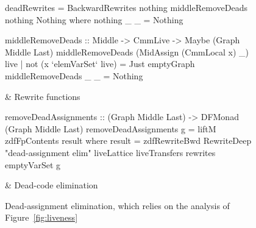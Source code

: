 \documentclass[blockstyle,preprint,nocopyrightspace]{sigplanconf}
\newcommand{\authornote}[1]{{\em #1}}
\def\authornote#1{\unskip\relax}
\newcommand{\john}[1]{\authornote{JD: #1}}
\newcommand\figref[1]{Figure~\ref{fig:#1}}
\newcommand\figlabel[1]{\label{fig:#1}}
\begin{document}



\begin{figure*}
\begin{codetable}
\T\begin{code}
deadRewrites = BackwardRewrites nothing middleRemoveDeads nothing Nothing
  where nothing _ _ = Nothing

middleRemoveDeads :: Middle -> CmmLive -> Maybe (Graph Middle Last)
middleRemoveDeads (MidAssign (CmmLocal x) _) live
    | not (x `elemVarSet` live) = Just emptyGraph
middleRemoveDeads _ _ = Nothing
\end{code}%
\B
& Rewrite \mbox{functions}\\
\hline

\T\begin{code}
removeDeadAssignments :: (Graph Middle Last) -> DFMonad (Graph Middle Last)
removeDeadAssignments g = liftM zdfFpContents result
     where result = zdfRewriteBwd RewriteDeep "dead-assignment elim"
                                  liveLattice liveTransfers rewrites emptyVarSet g
\end{code}%
& \mbox{Dead-code} elimination\\
\end{codetable}
\caption{Dead-assignment elimination, which relies on the analysis of
\figref{liveness}} 
\figlabel{dead-elim}
\end{figure*}
\end{document}
